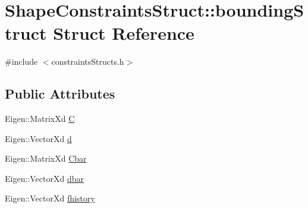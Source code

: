 \hypertarget{structShapeConstraintsStruct_1_1boundingStruct}{\section{\-Shape\-Constraints\-Struct\-:\-:bounding\-Struct \-Struct \-Reference}
\label{structShapeConstraintsStruct_1_1boundingStruct}
}


{\ttfamily \#include $<$constraints\-Structs.\-h$>$}

\subsection*{\-Public \-Attributes}
\begin{DoxyCompactItemize}
\item 
\-Eigen\-::\-Matrix\-Xd \hyperlink{structShapeConstraintsStruct_1_1boundingStruct_a888204a5f7e2ea854715605e1b6ba475}{\-C}
\item 
\-Eigen\-::\-Vector\-Xd \hyperlink{structShapeConstraintsStruct_1_1boundingStruct_a6d157c6e92332f3abdce6ccd12206380}{d}
\item 
\-Eigen\-::\-Matrix\-Xd \hyperlink{structShapeConstraintsStruct_1_1boundingStruct_acc45534da5c8b80be0012f6722d5569f}{\-Cbar}
\item 
\-Eigen\-::\-Vector\-Xd \hyperlink{structShapeConstraintsStruct_1_1boundingStruct_ab7b66b74697f335127d4a8cea0fecc2a}{dbar}
\item 
\-Eigen\-::\-Vector\-Xd \hyperlink{structShapeConstraintsStruct_1_1boundingStruct_aad4aa0527751939d9d1eb75c1f50b41b}{fhistory}
\end{DoxyCompactItemize}


